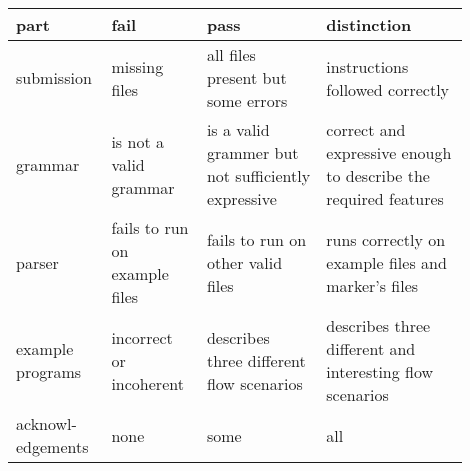 \documentclass[twoside=false, DIV=14]{scrartcl}
\begin{document}
\begin{tabular}{|p{0.15\linewidth}|p{0.2\linewidth}|p{0.25\linewidth}|p{0.30\linewidth}|}
  \hline
  \textbf{part} & \textbf{fail} & \textbf{pass} & \textbf{distinction} \\ \hline
  submission & missing files & all files present but some errors & instructions followed correctly \\ \hline
  grammar & is not a valid grammar & is a valid grammer but not sufficiently expressive & correct and expressive enough to describe the required features \\ \hline
  parser & fails to run on example files & fails to run on other valid files & runs correctly on example files and marker's files \\ \hline
  example programs & incorrect or incoherent & describes three different flow scenarios & describes three different and interesting flow scenarios \\ \hline
  acknowl-edgements & none & some & all \\ \hline
\end{tabular}
\end{document}
